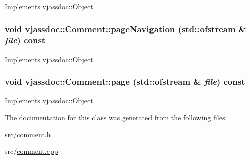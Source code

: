 Implements \hyperlink{classvjassdoc_1_1Object_bd43e77dbe80055f5adda67661dfaca4}{vjassdoc::Object}.\hypertarget{classvjassdoc_1_1Comment_4bcb5f83071ad7954b922fdaf8e0ea8e}{
\subsubsection{\setlength{\rightskip}{0pt plus 5cm}void vjassdoc::Comment::pageNavigation (std::ofstream \& {\em file}) const}}
\label{classvjassdoc_1_1Comment_4bcb5f83071ad7954b922fdaf8e0ea8e}




Implements \hyperlink{classvjassdoc_1_1Object_736bbb6719edd8070d8f56c364a2764c}{vjassdoc::Object}.\hypertarget{classvjassdoc_1_1Comment_d7b59c02557b961deb2f470b180bab7a}{
\subsubsection{\setlength{\rightskip}{0pt plus 5cm}void vjassdoc::Comment::page (std::ofstream \& {\em file}) const}}
\label{classvjassdoc_1_1Comment_d7b59c02557b961deb2f470b180bab7a}




Implements \hyperlink{classvjassdoc_1_1Object_a0489e38956f3507566b1bc6e3e2c8af}{vjassdoc::Object}.

The documentation for this class was generated from the following files:\begin{CompactItemize}
\item 
src/\hyperlink{comment_8h}{comment.h}\item 
src/\hyperlink{comment_8cpp}{comment.cpp}\end{CompactItemize}
